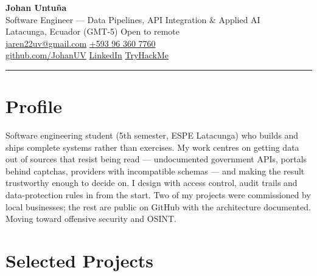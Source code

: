 \documentclass[10.5pt,a4paper]{article}
\begin{document}
{\Huge\bfseries Johan Untuña}\\[0.35em]
{\large\color{muted} Software Engineer --- Data Pipelines, API Integration \& Applied AI}\\[0.7em]
{\small
Latacunga, Ecuador (GMT-5) \textbullet{} Open to remote \\
\href{mailto:jaren22uv@gmail.com}{jaren22uv@gmail.com} \textbullet{}
\href{https://wa.me/593963607760}{+593 96 360 7760} \\
\href{https://github.com/JohanUV}{github.com/JohanUV} \textbullet{}
\href{https://www.linkedin.com/in/jaren-untu\%C3\%B1a-valiente-762799211/}{LinkedIn} \textbullet{}
\href{https://tryhackme.com/p/jaren22uv}{TryHackMe}
}

\vspace{0.45em}
{\color{ink}\rule{\linewidth}{1.1pt}}

\section*{Profile}
Software engineering student (5th semester, ESPE Latacunga) who builds and ships complete
systems rather than exercises. My work centres on getting data out of sources that resist
being read --- undocumented government APIs, portals behind captchas, providers with
incompatible schemas --- and making the result trustworthy enough to decide on. I design with
access control, audit trails and data-protection rules in from the start. Two of my projects
were commissioned by local businesses; the rest are public on GitHub with the architecture
documented. Moving toward offensive security and OSINT.

\section*{Selected Projects}
\end{document}
